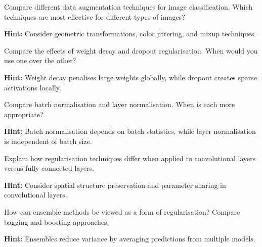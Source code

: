 \begin{problem}
Compare different data augmentation techniques for image classification. Which techniques are most effective for different types of images?

\textbf{Hint:} Consider geometric transformations, color jittering, and mixup techniques.
\end{problem}

\begin{problem}
Compare the effects of weight decay and dropout regularisation. When would you use one over the other?

\textbf{Hint:} Weight decay penalises large weights globally, while dropout creates sparse activations locally.
\end{problem}

\begin{problem}
Compare batch normalisation and layer normalisation. When is each more appropriate?

\textbf{Hint:} Batch normalisation depends on batch statistics, while layer normalisation is independent of batch size.
\end{problem}

\begin{problem}
Explain how regularisation techniques differ when applied to convolutional layers versus fully connected layers.

\textbf{Hint:} Consider spatial structure preservation and parameter sharing in convolutional layers.
\end{problem}

\begin{problem}
How can ensemble methods be viewed as a form of regularisation? Compare bagging and boosting approaches.

\textbf{Hint:} Ensembles reduce variance by averaging predictions from multiple models.
\end{problem}

